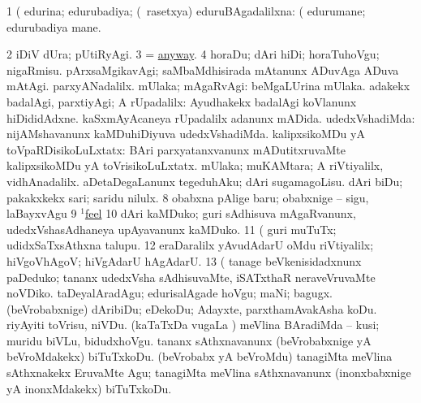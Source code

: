 \noindent 
\gl{\pagu}
\expl{}
\bmng
\bnum
\num{1}  (  edurina; edurubadiya; (\kanmu\ rasetxya) eduruBAgadalilxna:  (  edurumane; edurubadiya mane. 
\num{2}  iDiV dUra; pUtiRyAgi. 
\num{3}  = \hyperref{kandict_a.pdf}{A}{anyway(1)}{anyway}. 
\num{4}  horaDu; dAri hiDi; horaTuhoVgu; nigaRmisu. 
  
\banum
{} pArxsaMgikavAgi; saMbaMdhisirada mAtanunx ADuvAga ADuva mAtAgi. 
 parxyANadalilx. 
\eanum
\numie
{}  
\banum
{} mUlaka; mAgaRvAgi:  beMgaLUrina mUlaka. 
 adakekx badalAgi, parxtiyAgi; A rUpadalilx:  Ayudhakekx badalAgi koVlanunx hiDididAdxne.  kaSxmAyAcaneya rUpadalilx adanunx mADida. 
 udedxVshadiMda:  nijAMshavanunx kaMDuhiDiyuva udedxVshadiMda. 
 kalipxsikoMDu yA toVpaRDisikoLuLxtatx:  BAri parxyatanxvanunx mADutitxruvaMte kalipxsikoMDu yA toVrisikoLuLxtatx. 
 mUlaka; muKAMtara; A riVtiyalilx, vidhAnadalilx. 
\eanum
\numie
{}  
\banum
{} aDetaDegaLanunx tegeduhAku; dAri sugamagoLisu. 
 dAri biDu; pakakxkekx sari; saridu nilulx. 
\eanum
\numie
\num{8}  obabxna pAlige baru; obabxnige -- sigu, laBayxvAgu 
\num{9} \hyperref{kandict_f.pdf}{F}{feel(1) nuga(4)}{$^1$feel}  
\num{10}  dAri kaMDuko; guri sAdhisuva mAgaRvanunx, udedxVshasAdhaneya upAyavanunx kaMDuko. 
\num{11}  (    guri muTuTx; udidxSaTxsAthxna talupu. 
\num{12}  eraDaralilx yAvudAdarU oMdu riVtiyalilx; hiVgoVhAgoV; hiVgAdarU hAgAdarU. 
\hypertarget{way pagu13}{} 
\num{13}  (  tanage beVkenisidadxnunx paDeduko; tananx udedxVsha sAdhisuvaMte, iSATxthaR neraveVruvaMte noVDiko. 
  
\banum
{} taDeyalAradAgu; edurisalAgade hoVgu; maNi; bagugx. 
 (beVrobabxnige) dAribiDu; eDekoDu; Adayxte, parxthamAvakAsha koDu. 
 riyAyiti toVrisu, niVDu. 
 (kaTaTxDa \mo vugaLa \vi) meVlina BAradiMda -- kusi; muridu biVLu, bidudxhoVgu. 
\eanum
\numie
{}  
\banum
{} tananx sAthxnavanunx (beVrobabxnige yA beVroMdakekx) biTuTxkoDu. 
 (beVrobabx yA beVroMdu) tanagiMta meVlina sAthxnakekx EruvaMte Agu; tanagiMta meVlina sAthxnavanunx (inonxbabxnige yA inonxMdakekx) biTuTxkoDu. 

